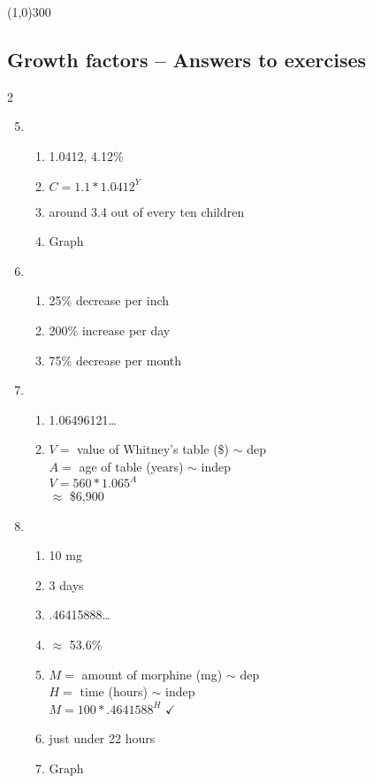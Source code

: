 \bigskip 

\begin{center}
\line(1,0){300} %
\end{center}

\subsection {Growth factors -- Answers to exercises} %

\begin{multicols} {2}
\begin{enumerate}
\setcounter{enumi}{4}

\item %
\begin{enumerate}
\item 1.0412, 4.12\%
\item $C=1.1 \ast 1.0412^Y$
\item around 3.4 out of every ten children
\item Graph
\end{enumerate}

\item 
\begin{enumerate}
\item %
25\% decrease per inch
\item %
200\% increase per day
\item %
75\% decrease per month 
\end{enumerate}

\item %
\begin{enumerate}
\item 1.06496121\ldots
\item $V=$ value of Whitney's table (\$) $\sim$ dep \\ $A=$ age of table (years) $\sim$ indep \\ $V=560 \ast 1.065^A$ \\ $\approx$ \$6,900
\end{enumerate}

\item %
\begin{enumerate}
\item 10 mg
\item 3 days
\item .46415888\ldots
\item $\approx$ 53.6\% 
\item $M=$ amount of morphine (mg) $\sim$ dep \\ $H=$ time (hours) $\sim$ indep \\ $M = 100 \ast .4641588^H$ $\checkmark$
\item just under 22 hours
\item Graph
\end{enumerate}


\end{enumerate}
\end{multicols}
